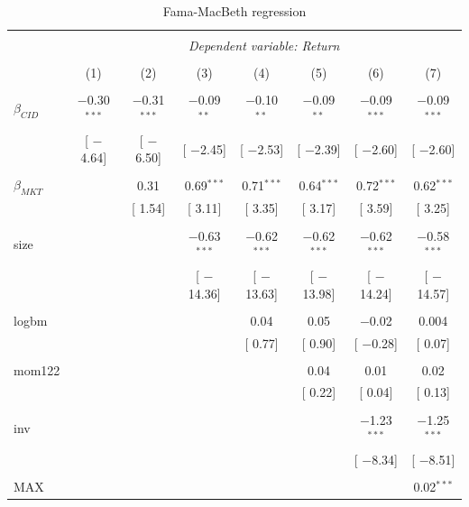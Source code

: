 \documentclass[12pt]{article}
\begin{document}
\begin{table}[!htbp] \centering 
  \caption{Fama-MacBeth regression} 
  \label{} 
\begin{tabular}{@{\extracolsep{0pt}}lccccccc} 
\\[-1.8ex]\hline 
\hline \\[-1.8ex] 
 & \multicolumn{7}{c}{\textit{Dependent variable: Return}} \\ 
\cline{2-8} 
\\[-1.8ex] & (1) & (2) & (3) & (4) & (5) & (6) & (7)\\ 
\hline \\[-1.8ex] 
 $\beta_{CID}$ & $-$0.30$^{***}$ & $-$0.31$^{***}$ & $-$0.09$^{**}$ & $-$0.10$^{**}$ & $-$0.09$^{**}$ & $-$0.09$^{***}$ & $-$0.09$^{***}$ \\ 
  & [ $-$4.64] & [ $-$6.50] & [ $-$2.45] & [ $-$2.53] & [ $-$2.39] & [ $-$2.60] & [ $-$2.60] \\ 
  & & & & & & & \\ 
 $\beta_{MKT}$ &  & 0.31 & 0.69$^{***}$ & 0.71$^{***}$ & 0.64$^{***}$ & 0.72$^{***}$ & 0.62$^{***}$ \\ 
  &  & [ 1.54] & [ 3.11] & [ 3.35] & [ 3.17] & [ 3.59] & [ 3.25] \\ 
  & & & & & & & \\ 
 size &  &  & $-$0.63$^{***}$ & $-$0.62$^{***}$ & $-$0.62$^{***}$ & $-$0.62$^{***}$ & $-$0.58$^{***}$ \\ 
  &  &  & [ $-$14.36] & [ $-$13.63] & [ $-$13.98] & [ $-$14.24] & [ $-$14.57] \\ 
  & & & & & & & \\ 
 logbm &  &  &  & 0.04 & 0.05 & $-$0.02 & 0.004 \\ 
  &  &  &  & [ 0.77] & [ 0.90] & [ $-$0.28] & [ 0.07] \\ 
  & & & & & & & \\ 
 mom122 &  &  &  &  & 0.04 & 0.01 & 0.02 \\ 
  &  &  &  &  & [ 0.22] & [ 0.04] & [ 0.13] \\ 
  & & & & & & & \\ 
 inv &  &  &  &  &  & $-$1.23$^{***}$ & $-$1.25$^{***}$ \\ 
  &  &  &  &  &  & [ $-$8.34] & [ $-$8.51] \\ 
  & & & & & & & \\ 
 MAX &  &  &  &  &  &  & 0.02$^{***}$ \\ 

\end{tabular}
\end{table}
\end{document}
